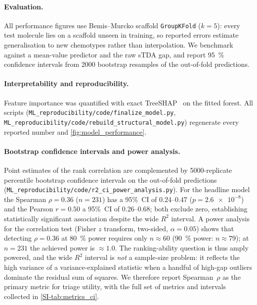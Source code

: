 \paragraph{Evaluation.}
All performance figures use Bemis--Murcko scaffold \texttt{GroupKFold}
($k=5$): every test molecule lies on a scaffold unseen in training, so reported
errors estimate generalisation to new chemotypes rather than interpolation.
We benchmark against a mean-value predictor and the raw sTDA gap, and report
\qty{95}{\percent} confidence intervals from \num{2000} bootstrap resamples of the
out-of-fold predictions.

\paragraph{Interpretability and reproducibility.}
Feature importance was quantified with exact TreeSHAP~\cite{Lundberg2017} on the
fitted forest. All scripts (\texttt{ML\_reproducibility/code/finalize\_model.py},
\texttt{ML\_reproducibility/code/rebuild\_structural\_model.py}) regenerate every reported number and
\cref{fig:model_performance}.

\paragraph{Bootstrap confidence intervals and power analysis.}
Point estimates of the rank correlation are complemented by
\num{5000}-replicate percentile bootstrap confidence intervals on the
out-of-fold predictions (\texttt{ML\_reproducibility/code/r2\_ci\_power\_analysis.py}).
For the headline model the Spearman $\rho = 0.36$ ($n = 231$) has a 95\%~CI of
\numrange{0.24}{0.47} ($p = \num{2.6e-8}$) and the Pearson $r = 0.50$ a 95\%~CI
of \numrange{0.26}{0.68}; both exclude zero, establishing statistically
significant association despite the wide $R^2$ interval.
A power analysis for the correlation test (Fisher $z$ transform, two-sided,
$\alpha = 0.05$) shows that detecting $\rho = 0.36$ at \qty{80}{\percent} power
requires only $n \approx 60$ (\qty{90}{\percent} power: $n \approx 79$); at
$n = 231$ the achieved power is $\approx 1.0$. The ranking-ability question is
thus amply powered, and the wide $R^2$ interval is \emph{not} a sample-size
problem: it reflects the high variance of a variance-explained statistic when a
handful of high-gap outliers dominate the residual sum of squares. We therefore
report Spearman~$\rho$ as the primary metric for triage utility, with the full
set of metrics and intervals collected in \cref{SI-tab:metrics_ci}.

